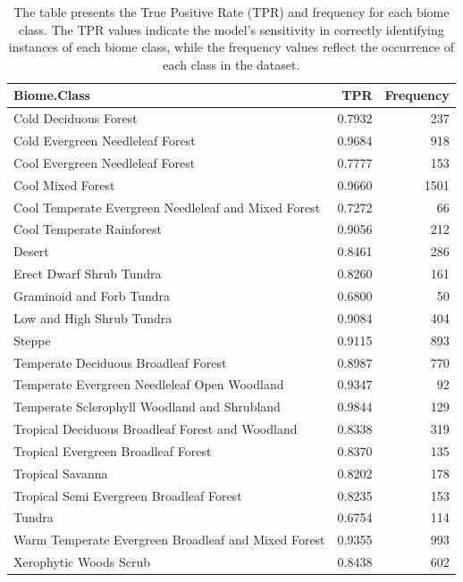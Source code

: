 \documentclass[
]{krantz}
\begin{document}
\begin{table}

\caption{\label{tab:table2}The table presents the True Positive Rate (TPR) and frequency for each biome class. The TPR values indicate the model's sensitivity in correctly identifying instances of each biome class, while the frequency values reflect the occurrence of each class in the dataset.}
\centering
\begin{tabular}[t]{l|r|r}
\hline
Biome.Class & TPR & Frequency\\
\hline
Cold Deciduous Forest & 0.7932 & 237\\
\hline
Cold Evergreen Needleleaf Forest & 0.9684 & 918\\
\hline
Cool Evergreen Needleleaf Forest & 0.7777 & 153\\
\hline
Cool Mixed Forest & 0.9660 & 1501\\
\hline
Cool Temperate Evergreen Needleleaf and Mixed Forest & 0.7272 & 66\\
\hline
Cool Temperate Rainforest & 0.9056 & 212\\
\hline
Desert & 0.8461 & 286\\
\hline
Erect Dwarf Shrub Tundra & 0.8260 & 161\\
\hline
Graminoid and Forb Tundra & 0.6800 & 50\\
\hline
Low and High Shrub Tundra & 0.9084 & 404\\
\hline
Steppe & 0.9115 & 893\\
\hline
Temperate Deciduous Broadleaf Forest & 0.8987 & 770\\
\hline
Temperate Evergreen Needleleaf Open Woodland & 0.9347 & 92\\
\hline
Temperate Sclerophyll Woodland and Shrubland & 0.9844 & 129\\
\hline
Tropical Deciduous Broadleaf Forest and Woodland & 0.8338 & 319\\
\hline
Tropical Evergreen Broadleaf Forest & 0.8370 & 135\\
\hline
Tropical Savanna & 0.8202 & 178\\
\hline
Tropical Semi Evergreen Broadleaf Forest & 0.8235 & 153\\
\hline
Tundra & 0.6754 & 114\\
\hline
Warm Temperate Evergreen Broadleaf and Mixed Forest & 0.9355 & 993\\
\hline
Xerophytic Woods Scrub & 0.8438 & 602\\
\hline
\end{tabular}
\end{table}
\end{document}
